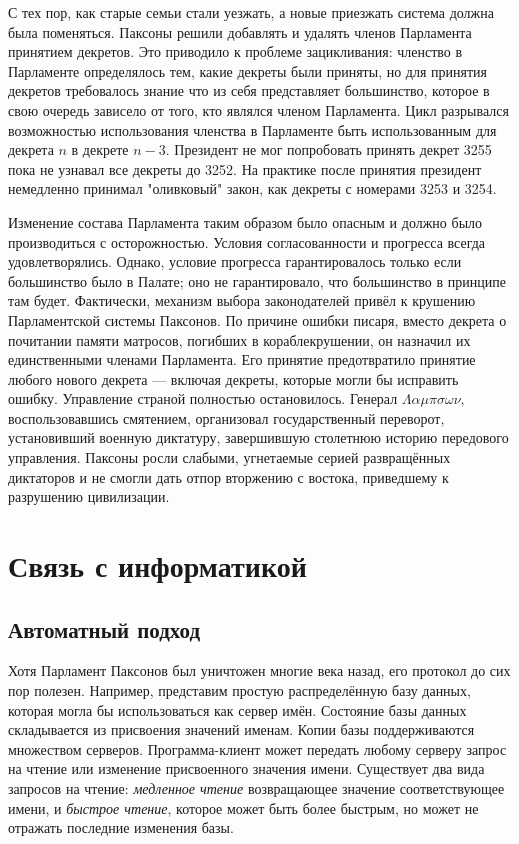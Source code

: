 \documentclass[12pt, a4paper]{article} %
\begin{document}
С тех пор, как старые семьи стали уезжать, а новые приезжать система должна была поменяться. Паксоны решили добавлять и удалять членов Парламента принятием декретов. Это приводило к проблеме зацикливания: членство в Парламенте определялось тем, какие декреты были приняты, но для принятия декретов требовалось знание что из себя представляет большинство, которое в свою очередь зависело от того, кто являлся членом Парламента. Цикл разрывался возможностью использования членства в Парламенте быть использованным для декрета $n$ в декрете $n-3$. Президент не мог попробовать принять декрет 3255 пока не узнавал все декреты до 3252. На практике после принятия 
президент немедленно принимал "оливковый" закон, как декреты с номерами 3253 и 3254.

Изменение состава Парламента таким образом было опасным и должно было производиться с осторожностью. Условия согласованности и прогресса всегда удовлетворялись. Однако, условие прогресса гарантировалось только если большинство было в Палате; оно не гарантировало, что большинство  в принципе там будет. Фактически, механизм выбора законодателей привёл к крушению Парламентской системы Паксонов. По причине ошибки писаря, вместо декрета о почитании памяти матросов, погибших в кораблекрушении, он назначил их единственными членами Парламента. Его принятие предотвратило принятие любого нового декрета --- включая декреты, которые могли бы исправить ошибку. Управление страной полностью остановилось. Генерал $\Lambda\alpha\mu\pi\sigma\omega\nu$, воспользовавшись смятением, организовал государственный переворот, установивший военную диктатуру, завершившую столетнюю историю передового управления. Паксоны росли слабыми, угнетаемые серией развращённых диктаторов и не смогли дать отпор вторжению с востока, приведшему к разрушению цивилизации.

\section{Связь с информатикой}\label{sec:csconnection}

\subsection{Автоматный подход}

Хотя Парламент Паксонов был уничтожен многие века назад, его протокол до сих пор полезен. Например, представим простую распределённую базу данных, которая могла бы использоваться как сервер имён. Состояние базы данных складывается из присвоения значений именам. Копии базы поддерживаются множеством серверов. Программа-клиент может передать любому серверу запрос на чтение или изменение присвоенного значения имени. Существует два вида запросов на чтение: \textit{медленное чтение} возвращающее значение соответствующее имени, и \textit{быстрое чтение}, которое может быть более быстрым, но может не отражать последние изменения базы.
\end{document}
